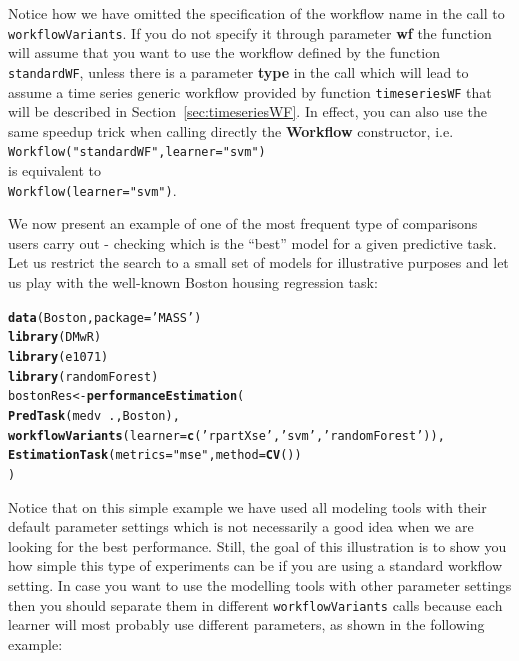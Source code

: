 \documentclass[10pt,a4paper]{article}\usepackage[]{graphicx}\usepackage[]{color}
\makeatletter
\newcommand{\hlstr}[1]{\textcolor[rgb]{0.192,0.494,0.8}{#1}}%
\newcommand{\hlopt}[1]{\textcolor[rgb]{0,0,0}{#1}}%
\newcommand{\hlstd}[1]{\textcolor[rgb]{0.345,0.345,0.345}{#1}}%
\newcommand{\hlkwb}[1]{\textcolor[rgb]{0.69,0.353,0.396}{#1}}%
\newcommand{\hlkwc}[1]{\textcolor[rgb]{0.333,0.667,0.333}{#1}}%
\newcommand{\hlkwd}[1]{\textcolor[rgb]{0.737,0.353,0.396}{\textbf{#1}}}%
\newenvironment{kframe}{%
 \def\at@end@of@kframe{}%
 \ifinner\ifhmode%
  \def\at@end@of@kframe{\end{minipage}}%
  \begin{minipage}{\columnwidth}%
 \fi\fi%
 \def\FrameCommand##1{\hskip\@totalleftmargin \hskip-\fboxsep
 \colorbox{shadecolor}{##1}\hskip-\fboxsep
     \hskip-\linewidth \hskip-\@totalleftmargin \hskip\columnwidth}%
 \MakeFramed {\advance\hsize-\width
   \@totalleftmargin\z@ \linewidth\hsize
   \@setminipage}}%
 {\par\unskip\endMakeFramed%
 \at@end@of@kframe}
\newenvironment{knitrout}{}{} %
\makeatother
\begin{document}
Notice how we have omitted the specification of the workflow name in the call to \texttt{workflowVariants}. If you do not specify it through parameter \textbf{wf} the function will assume that you want to use the workflow defined by the function \texttt{standardWF}, unless there is a parameter \textbf{type} in the call which will lead to assume a time series generic workflow provided by function \texttt{timeseriesWF} that will be described in Section~\ref{sec:timeseriesWF}. In effect, you can also use the same speedup trick when calling directly the \textbf{Workflow} constructor, i.e. \\
\texttt{Workflow("standardWF",learner="svm")} \\
is equivalent to \\
\texttt{Workflow(learner="svm")}.

We now present an example of one of the most frequent type of
comparisons users carry out - checking which is the ``best'' model for
a given predictive task. Let us restrict the search to a small set of
models for illustrative purposes and let us play with the well-known
Boston housing regression task:


\begin{knitrout}\footnotesize
{}\color{fgcolor}\begin{kframe}
\begin{alltt}
\hlkwd{data}\hlstd{(Boston,}\hlkwc{package}\hlstd{=}\hlstr{'MASS'}\hlstd{)}
\hlkwd{library}\hlstd{(DMwR)}
\hlkwd{library}\hlstd{(e1071)}
\hlkwd{library}\hlstd{(randomForest)}
\hlstd{bostonRes} \hlkwb{<-} \hlkwd{performanceEstimation}\hlstd{(}
  \hlkwd{PredTask}\hlstd{(medv} \hlopt{~} \hlstd{.,Boston),}
  \hlkwd{workflowVariants}\hlstd{(}\hlkwc{learner}\hlstd{=}\hlkwd{c}\hlstd{(}\hlstr{'rpartXse'}\hlstd{,}\hlstr{'svm'}\hlstd{,}\hlstr{'randomForest'}\hlstd{)),}
  \hlkwd{EstimationTask}\hlstd{(}\hlkwc{metrics}\hlstd{=}\hlstr{"mse"}\hlstd{,}\hlkwc{method}\hlstd{=}\hlkwd{CV}\hlstd{())}
  \hlstd{)}
\end{alltt}
\end{kframe}
\end{knitrout}

Notice that on this simple example we have used all modeling tools
with their default parameter settings which is not necessarily a good
idea when we are looking for the best performance. Still, the goal of
this illustration is to show you how simple this type of experiments
can be if you are using a standard workflow setting. In case you want
to use the modelling tools with other parameter settings then you
should separate them in different \texttt{workflowVariants} calls because each learner will most probably use different parameters, as shown
in the following example:
\end{document}
